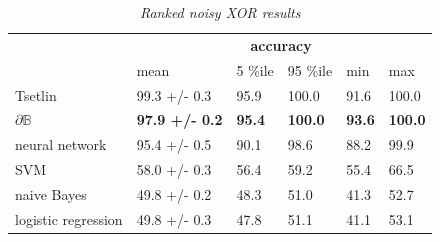 \documentclass{article} %
\begin{document}
\begin{table}[t]
	\centering
	\begin{tabular}{llllll}
		\cline{2-6}
		\multicolumn{1}{c}{}                       & \multicolumn{5}{c}{\textbf{accuracy}}                                                                                                                                                            \\ \cline{2-6} 
		\multicolumn{1}{l|}{}                      & \multicolumn{1}{l|}{mean}                  & \multicolumn{1}{l|}{5 \%ile}       & \multicolumn{1}{l|}{95 \%ile}       & \multicolumn{1}{l|}{min}           & \multicolumn{1}{l|}{max}            \\ \hline
		\multicolumn{1}{|l|}{Tsetlin}              & \multicolumn{1}{l|}{99.3 +/- 0.3}          & \multicolumn{1}{l|}{95.9}          & \multicolumn{1}{l|}{100.0}          & \multicolumn{1}{l|}{91.6}          & \multicolumn{1}{l|}{100.0}          \\ \hline
		\multicolumn{1}{|l|}{$\partial\mathbb{B}$} & \multicolumn{1}{l|}{\textbf{97.9 +/- 0.2}} & \multicolumn{1}{l|}{\textbf{95.4}} & \multicolumn{1}{l|}{\textbf{100.0}} & \multicolumn{1}{l|}{\textbf{93.6}} & \multicolumn{1}{l|}{\textbf{100.0}} \\ \hline
		\multicolumn{1}{|l|}{neural network}       & \multicolumn{1}{l|}{95.4 +/- 0.5}          & \multicolumn{1}{l|}{90.1}          & \multicolumn{1}{l|}{98.6}           & \multicolumn{1}{l|}{88.2}          & \multicolumn{1}{l|}{99.9}           \\ \hline
		\multicolumn{1}{|l|}{SVM}                  & \multicolumn{1}{l|}{58.0 +/- 0.3}          & \multicolumn{1}{l|}{56.4}          & \multicolumn{1}{l|}{59.2}           & \multicolumn{1}{l|}{55.4}          & \multicolumn{1}{l|}{66.5}           \\ \hline
		\multicolumn{1}{|l|}{naive Bayes}          & \multicolumn{1}{l|}{49.8 +/- 0.2}          & \multicolumn{1}{l|}{48.3}          & \multicolumn{1}{l|}{51.0}           & \multicolumn{1}{l|}{41.3}          & \multicolumn{1}{l|}{52.7}           \\ \hline
		\multicolumn{1}{|l|}{logistic regression}  & \multicolumn{1}{l|}{49.8 +/- 0.3}          & \multicolumn{1}{l|}{47.8}          & \multicolumn{1}{l|}{51.1}           & \multicolumn{1}{l|}{41.1}          & \multicolumn{1}{l|}{53.1}           \\ \hline
	\end{tabular}
	\caption{{\em Ranked noisy XOR results}}
	\label{tab:noisy-xor-results}
\end{table}
\end{document}
